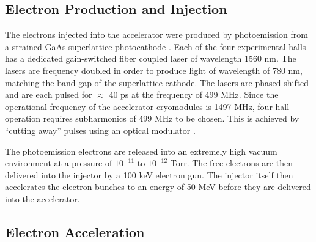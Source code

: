 \subsection{Electron Production and Injection}

The electrons injected into the accelerator were produced by photoemission from
a strained GaAs superlattice photocathode \cite{Maruyama:2004hx}.  Each of the 
four experimental halls has a dedicated gain-switched fiber coupled laser of
wavelength 1560 nm.  The lasers are frequency doubled in order to produce light
of wavelength of 780 nm, matching the band gap of the superlattice cathode. The
lasers are phased shifted and are each pulsed for $\approx$ 40 ps at the 
frequency of 499 MHz.  Since the operational frequency of the accelerator 
cryomodules is 1497 MHz, four hall operation requires subharmonics of 499 MHz to
be chosen.  This is achieved by ``cutting away'' pulses using an optical 
modulator \cite{Kazimi:2013yua}.

The photoemission electrons are released into an extremely high vacuum
environment at a pressure of $10^{-11}$ to $10^{-12}$ Torr.  The free electrons
are then delivered into the injector by a 100 keV electron gun.  The injector
itself then accelerates the electron bunches to an energy of 50 MeV 
before they are delivered into the accelerator.

\subsection{Electron Acceleration}

